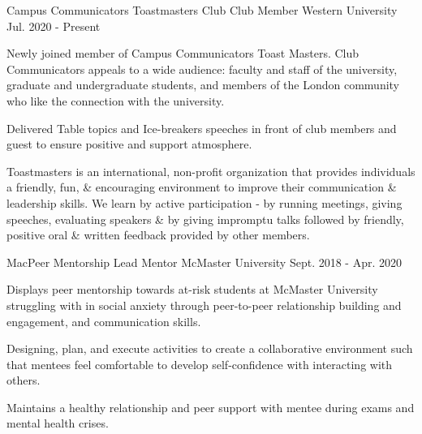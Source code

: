 
\begin{cventries}

  \cventry
    {Campus Communicators Toastmasters Club} %
    {Club Member} %
    {Western University} %
    {Jul. 2020 - Present} %
    {
      \begin{cvitems} %
        \item {Newly joined member of Campus Communicators Toast Masters. Club Communicators appeals to a wide audience: faculty and staff of the university, graduate and undergraduate students, and members of the London community who like the connection with the university.}
        \item {Delivered Table topics and Ice-breakers speeches in front of club members and guest to ensure positive and support atmosphere.} 
        \item{Toastmasters is an international, non-profit organization that provides individuals a friendly, fun, \& encouraging environment to improve their communication \& leadership skills. We learn by active participation - by running meetings, giving speeches, evaluating speakers \& by giving impromptu talks followed by friendly, positive oral \& written feedback provided by other members.}
        \end{cvitems}
      }
    

  \cventry
    {MacPeer Mentorship} %
    {Lead Mentor} %
    {McMaster University} %
    {Sept. 2018 - Apr. 2020} %
    {
      \begin{cvitems} %
        \item {Displays peer mentorship towards at-risk students at McMaster University struggling with in social anxiety through peer-to-peer relationship building and engagement, and communication skills.}
        \item{Designing, plan, and execute activities to create a collaborative environment such that mentees feel comfortable to develop self-confidence with interacting with others.}
        \item {Maintains a healthy relationship and peer support with mentee during exams and mental health crises.} 
      \end{cvitems}
    }


\end{cventries}
